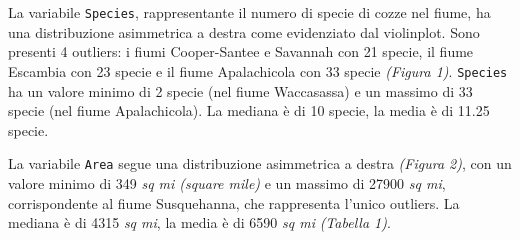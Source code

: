 \documentclass{article} %
\begin{document}
La variabile \texttt{Species}, rappresentante 
il numero di specie di cozze nel fiume, ha una distribuzione asimmetrica a destra 
come evidenziato dal violinplot. Sono presenti 4 outliers: i fiumi Cooper-Santee e Savannah con 21 specie, il fiume Escambia con 23 specie e il fiume Apalachicola con 33 specie \textit{(Figura 1)}. \texttt{Species} ha un valore minimo di 2 specie (nel fiume Waccasassa) e un massimo di 33 specie (nel fiume Apalachicola). La mediana è di 10 specie, la media è di 11.25 specie.

La variabile \texttt{Area} segue una distribuzione asimmetrica a destra \textit{(Figura 2)}, con un valore minimo di 349 \textit{sq mi (square mile)} e un massimo di 27900 \textit{sq mi}, corrispondente al fiume Susquehanna, che rappresenta l'unico outliers. La mediana è di 4315 \textit{sq mi}, la media è di 6590 \textit{sq mi} \textit{(Tabella 1)}.
\end{document}
